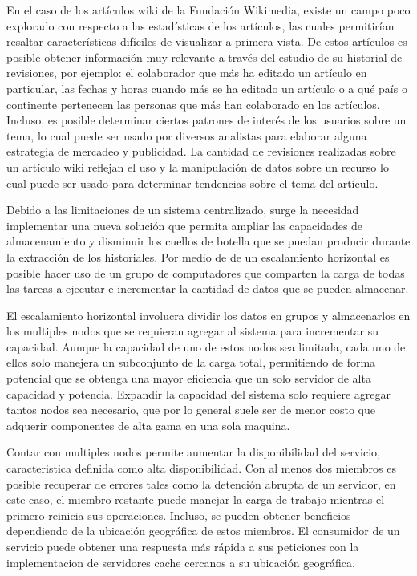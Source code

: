 En el caso de los artículos wiki de la Fundación Wikimedia, existe un campo poco
explorado con respecto a las estadísticas de los artículos, las cuales permitirían resaltar
características difíciles de visualizar a primera vista. De estos artículos es posible
obtener información muy relevante a través del estudio de su historial de revisiones, por ejemplo:
el colaborador que más ha editado un artículo en particular, las fechas y
horas cuando más se ha editado un artículo o a qué país o continente pertenecen las
personas que más han colaborado en los artículos. Incluso, es posible determinar ciertos
patrones de interés de los usuarios sobre un tema, lo cual puede ser usado por diversos
analistas para elaborar alguna estrategia de mercadeo y publicidad. La cantidad de
revisiones realizadas sobre un artículo wiki reflejan el uso y la manipulación de datos
sobre un recurso lo cual puede ser usado para determinar tendencias sobre el tema del
artículo.

Debido a las limitaciones de un sistema centralizado, surge la necesidad implementar una nueva solución
que permita ampliar las capacidades de almacenamiento y disminuir los cuellos de botella que se puedan
producir durante la extracción de los historiales. Por medio de de un escalamiento horizontal
es posible hacer uso de un grupo de computadores que comparten la carga de todas las tareas a ejecutar e
incrementar la cantidad de datos que se pueden almacenar.

El escalamiento horizontal involucra dividir los datos en grupos y almacenarlos en los multiples nodos
que se requieran agregar al sistema para incrementar su capacidad. Aunque la capacidad de uno de estos
nodos sea limitada, cada uno de ellos solo manejera un subconjunto de la carga total, permitiendo
de forma potencial que se obtenga una mayor eficiencia que un solo servidor de alta capacidad y potencia.
Expandir la capacidad del sistema solo requiere agregar tantos nodos sea necesario, que por lo general
suele ser de menor costo que adquerir componentes de alta gama en una sola maquina.

Contar con multiples nodos permite aumentar la disponibilidad del servicio, caracteristica
definida como alta disponibilidad. Con al menos dos miembros es posible recuperar de errores tales como
la detención abrupta de un servidor, en este caso, el miembro restante puede manejar la carga de trabajo
mientras el primero reinicia sus operaciones. Incluso, se pueden obtener beneficios dependiendo de
la ubicación geográfica de estos miembros. El consumidor de un servicio puede obtener una respuesta
más rápida a sus peticiones con la implementacion de servidores cache cercanos a su ubicación geográfica.


